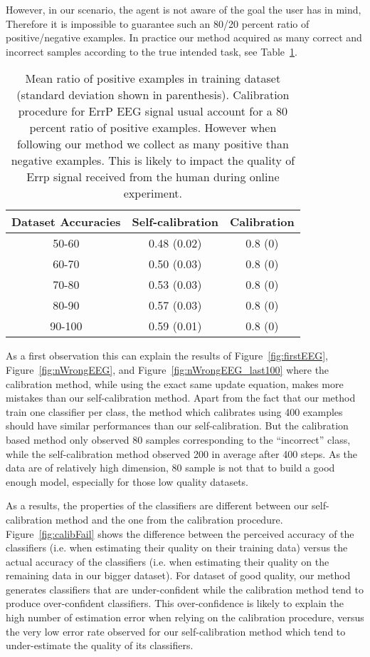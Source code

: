 However, in our scenario, the agent is not aware of the goal the user has in mind, Therefore it is impossible to guarantee such an 80/20 percent ratio of positive/negative examples. In practice our method acquired as many correct and incorrect samples according to the true intended task, see Table~\ref{tab:correctLabelRatio}.

\begin{table}
\centering
\begin{tabular}{c c c}
Dataset Accuracies & Self-calibration & Calibration \\ \hline
50-60 & 0.48 (0.02) & 0.8 (0) \\
60-70 & 0.50 (0.03) & 0.8 (0) \\
70-80 & 0.53 (0.03) & 0.8 (0) \\
80-90 & 0.57 (0.03) & 0.8 (0) \\
90-100 & 0.59 (0.01) & 0.8 (0) \\
\end{tabular}
\caption{Mean ratio of positive examples in training dataset (standard deviation shown in parenthesis). Calibration procedure for ErrP EEG signal usual account for a 80 percent ratio of positive examples. However when following our method we collect as many positive than negative examples. This is likely to impact the quality of Errp signal received from the human during online experiment.}
\label{tab:correctLabelRatio}
\end{table}

As a first observation this can explain the results of Figure~\ref{fig:firstEEG}, Figure~\ref{fig:nWrongEEG}, and Figure~\ref{fig:nWrongEEG_last100} where the calibration method, while using the exact same update equation, makes more mistakes than our self-calibration method. Apart from the fact that our method train one classifier per class, the method which calibrates using 400 examples should have similar performances than our self-calibration. But the calibration based method only observed 80 samples corresponding to the ``incorrect'' class, while the self-calibration method observed 200 in average after 400 steps. As the data are of relatively high dimension, 80 sample is not that to build a good enough model, especially for those low quality datasets.

As a results, the properties of the classifiers are different between our self-calibration method and the one from the calibration procedure. Figure~\ref{fig:calibFail} shows the difference between the perceived accuracy of the classifiers (i.e. when estimating their quality on their training data) versus the actual accuracy of the classifiers (i.e. when estimating their quality on the remaining data in our bigger dataset). For dataset of good quality, our method generates classifiers that are under-confident while the calibration method tend to produce over-confident classifiers. This over-confidence is likely to explain the high number of estimation error when relying on the  calibration procedure, versus the very low error rate observed for our self-calibration method which tend to under-estimate the quality of its classifiers.

